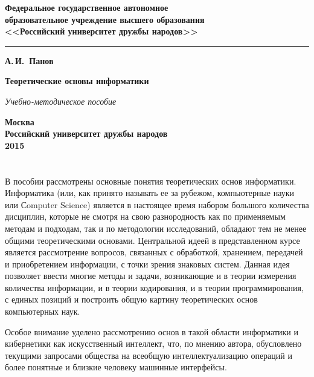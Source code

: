 \documentclass[b5paper,11pt]{book}
\begin{document}
	\begin{titlepage}
		\begin{center}
			{\bfseries  Федеральное государственное автономное \\
				образовательное учреждение высшего образования\\
				<<Российский университет дружбы народов>>
				
			}

			\vspace{-5pt}
			\noindent\rule{\textwidth}{2pt}
			
			\vspace{50pt}
			{\Large\bfseries А.\,И.~Панов}
			
			\vspace{100pt}
			{\Huge\bfseries Теоретические основы информатики}
			
			\vspace{20pt}
			{\Large\itshape Учебно-методическое пособие}
			
			\vfill
			{\bfseries Москва\\
				Российский университет дружбы народов\\
				2015
			}
		\end{center}
	\end{titlepage}
	
	\chapter*{}
	
	В пособии рассмотрены основные понятия теоретических основ информатики. Информатика (или, как принято называть ее за рубежом, компьютерные науки или Сomputer Science) является в настоящее время набором большого количества дисциплин, которые не смотря на свою разнородность как по применяемым методам и подходам, так и по методологии исследований, обладают тем не менее общими теоретическими основами. Центральной идеей в представленном курсе является рассмотрение вопросов, связанных с обработкой, хранением, передачей и приобретением информации, с точки зрения знаковых систем. Данная идея позволяет ввести многие методы и задачи, возникающие и в теории измерения количества информации, и в теории кодирования, и в теории программирования, с единых позиций и построить общую картину теоретических основ компьютерных наук.
	
	Особое внимание уделено рассмотрению основ в такой области информатики и кибернетики как искусственный интеллект, что, по мнению автора, обусловлено текущими запросами общества на всеобщую интеллектуализацию операций и более понятные и близкие человеку машинные интерфейсы. 
	
\end{document}
